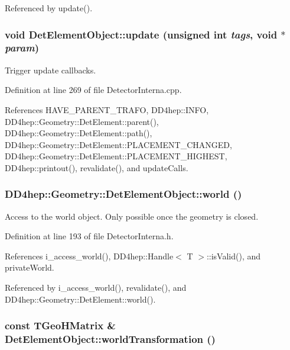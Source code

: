Referenced by update().\hypertarget{class_d_d4hep_1_1_geometry_1_1_det_element_object_a826e6ef5e3869b55970bd7c74f57b3a1}{
\subsubsection[{update}]{\setlength{\rightskip}{0pt plus 5cm}void DetElementObject::update (unsigned int {\em tags}, \/  void $\ast$ {\em param})}}
\label{class_d_d4hep_1_1_geometry_1_1_det_element_object_a826e6ef5e3869b55970bd7c74f57b3a1}


Trigger update callbacks. 

Definition at line 269 of file DetectorInterna.cpp.

References HAVE\_\-PARENT\_\-TRAFO, DD4hep::INFO, DD4hep::Geometry::DetElement::parent(), DD4hep::Geometry::DetElement::path(), DD4hep::Geometry::DetElement::PLACEMENT\_\-CHANGED, DD4hep::Geometry::DetElement::PLACEMENT\_\-HIGHEST, DD4hep::printout(), revalidate(), and updateCalls.\hypertarget{class_d_d4hep_1_1_geometry_1_1_det_element_object_aab07042df4ed702bedeb898bf17c180f}{
\subsubsection[{world}]{ DD4hep::Geometry::DetElementObject::world ()}}
\label{class_d_d4hep_1_1_geometry_1_1_det_element_object_aab07042df4ed702bedeb898bf17c180f}


Access to the world object. Only possible once the geometry is closed. 

Definition at line 193 of file DetectorInterna.h.

References i\_\-access\_\-world(), DD4hep::Handle$<$ T $>$::isValid(), and privateWorld.

Referenced by i\_\-access\_\-world(), revalidate(), and DD4hep::Geometry::DetElement::world().\hypertarget{class_d_d4hep_1_1_geometry_1_1_det_element_object_acb5621525dd6d99d263424e298a4002b}{
\subsubsection[{worldTransformation}]{\setlength{\rightskip}{0pt plus 5cm}const TGeoHMatrix \& DetElementObject::worldTransformation ()}}
\label{class_d_d4hep_1_1_geometry_1_1_det_element_object_acb5621525dd6d99d263424e298a4002b}


